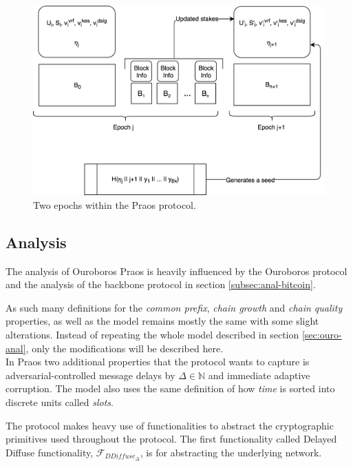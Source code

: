 \begin{figure}[H]
    \centering
    \includegraphics[width=\linewidth]{images/Praos-epoch.png}
    \caption{Two epochs within the Praos protocol.}
    \label{fig:praos-epochs}
\end{figure}

\subsection{Analysis}

The analysis of Ouroboros Praos is heavily influenced by the Ouroboros protocol and the analysis of the backbone protocol in section \ref{subsec:anal-bitcoin}.

As such many definitions for the \emph{common prefix}, \emph{chain growth} and \emph{chain quality} properties, as well as the model remains mostly the same with some slight alterations. Instead of repeating the whole model described in section \ref{sec:ouro-anal}, only the modifications will be described here.\\

In Praos two additional properties that the protocol wants to capture is adversarial-controlled message delays by $\Delta \in \mathbb{N}$ and immediate adaptive corruption. The model also uses the same definition of how \emph{time} is sorted into discrete units called \emph{slots}. 


The protocol makes heavy use of functionalities to abstract the cryptographic primitives used throughout the protocol. The first functionality called Delayed Diffuse functionality, $\mathcal{F}_{DDiffuse_{\Delta}}$, is for abstracting the underlying network.


